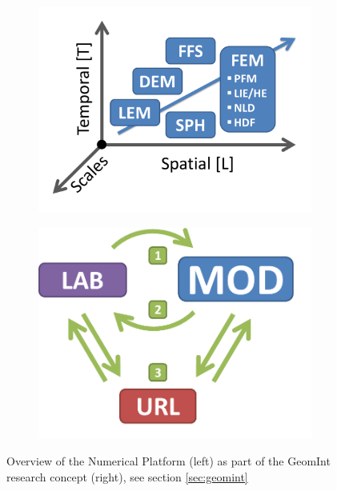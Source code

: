 \begin{figure}[ht!]
\begin{subfigure}[c]{0.6\textwidth}
\includegraphics[width=0.99\textwidth]{figures/geomint-mod-overview}
\label{fig:sub1}
\end{subfigure}
\begin{subfigure}[c]{0.38\textwidth}
\includegraphics[width=0.99\textwidth]{figures/geomint-concept-mod.png}
\label{fig:sub2}
\end{subfigure}
\caption{Overview of the Numerical Platform (left) as part of the GeomInt research concept (right), see section \ref{sec:geomint}}
\label{fig:num-overview}
\end{figure}

